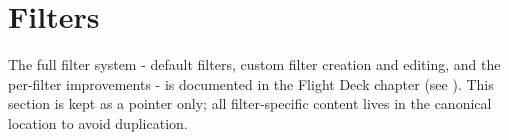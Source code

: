 \section{Filters}
\label{sec:ui_filters}

The full filter system - default filters, custom filter creation and editing, and the per-filter improvements - is documented in the Flight Deck chapter (see ). This section is kept as a pointer only; all filter-specific content lives in the canonical location to avoid duplication.
